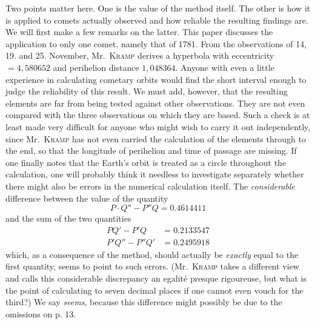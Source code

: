 Two points matter here. One is the value of the method itself. The other is how it is applied to comets actually observed and how reliable the resulting findings are. We will first make a few remarks on the latter. This paper discusses the application to only one comet, namely that of 1781. From the observations of 14, 19. and 25. November, Mr.\ \textsc{Kramp} derives a hyperbola with eccentricity $= 4,580652$ and perihelion distance $1,048364$. Anyone with even a little experience in calculating cometary orbits would find the short interval enough to judge the reliability of this result. We must add, however, that the resulting elements are far from being tested against other observations. They are not even compared with the three observations on which they are based. Such a check is at least made very difficult for anyone who might wish to carry it out independently, since Mr.\ \textsc{Kramp} has not even carried the calculation of the elements through to the end, so that the longitude of perihelion and time of passage are missing. If one finally notes that the Earth’s orbit is treated as a circle throughout the calculation, one will probably think it needless to investigate separately whether there might also be errors in the numerical calculation itself. The \emph{considerable} difference between the value of the quantity
\[
P\!\cdot\!Q'' - P''Q = 0.4614411
\]
and the sum of the two quantities
\[
\begin{aligned}
PQ' - P'Q &= 0.2133547\\
P'Q'' - P''Q' &= 0.2495918
\end{aligned}
\]
which, as a consequence of the method, should actually be \emph{exactly} equal to the first quantity, seems to point to such errors. (Mr.\ \textsc{Kramp} takes a different view and calls this considerable discrepancy an egalité presque rigoureuse, but what is the point of calculating to seven decimal places if one cannot even vouch for the third?) We say \emph{seems}, because this difference might possibly be due to the omissions on p. 13.

